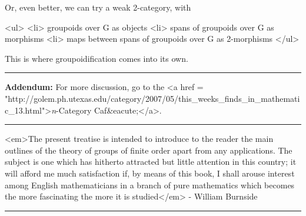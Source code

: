 Or, even better, we can try a weak 2-category, with 

<ul>
<li>
 groupoids over G as objects
<li>
 spans of groupoids over G as morphisms
<li>
 maps between spans of groupoids over G as 2-morphisms
</ul>

This is where groupoidification comes into its own.

\par\noindent\rule{\textwidth}{0.4pt}
\textbf{Addendum:} 
For more discussion, go to the <a href = "http://golem.ph.utexas.edu/category/2007/05/this_weeks_finds_in_mathematic_13.html">\emph{n}-Category
Caf&eacute;</a>.

\par\noindent\rule{\textwidth}{0.4pt}
<em>The present treatise is intended to introduce to the reader the main
outlines of the theory of groups of finite order apart from any applications.
The subject is one which has hitherto attracted but little attention in 
this country; it will afford me much satisfaction if, by means of this
book, I shall arouse interest among English mathematicians in a branch
of pure mathematics which becomes the more fascinating the more it is 
studied</em> - William Burnside

\par\noindent\rule{\textwidth}{0.4pt}

